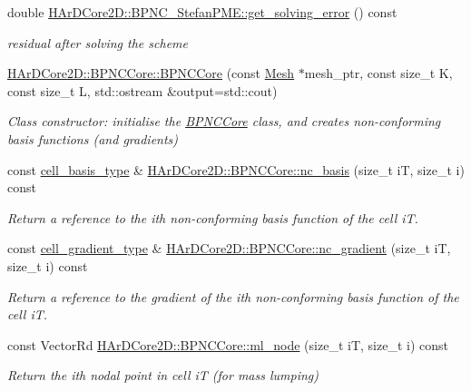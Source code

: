\begin{DoxyCompactItemize}
\mbox{\label{group__BPNC_gabb15277c1c88313e9e8e18186fea2b2f}} 
double \hyperlink{group__BPNC_gabb15277c1c88313e9e8e18186fea2b2f}{H\+Ar\+D\+Core2\+D\+::\+B\+P\+N\+C\+\_\+\+Stefan\+P\+M\+E\+::get\+\_\+solving\+\_\+error} () const
\begin{DoxyCompactList}\small\item\em residual after solving the scheme \end{DoxyCompactList}\item 
\hyperlink{group__BPNC_ga063bc1a24f9fbe136809f447fc25a486}{H\+Ar\+D\+Core2\+D\+::\+B\+P\+N\+C\+Core\+::\+B\+P\+N\+C\+Core} (const \hyperlink{classHArDCore2D_1_1Mesh}{Mesh} $\ast$mesh\+\_\+ptr, const size\+\_\+t K, const size\+\_\+t L, std\+::ostream \&output=std\+::cout)
\begin{DoxyCompactList}\small\item\em Class constructor\+: initialise the \hyperlink{classHArDCore2D_1_1BPNCCore}{B\+P\+N\+C\+Core} class, and creates non-\/conforming basis functions (and gradients) \end{DoxyCompactList}\item 
const \hyperlink{classHArDCore2D_1_1BPNCCore_a3aa8544d9ea9ae31d70e65aaefb0e9c8}{cell\+\_\+basis\+\_\+type} \& \hyperlink{group__BPNC_ga169de49549ae3c009c54c24d72d2e0ec}{H\+Ar\+D\+Core2\+D\+::\+B\+P\+N\+C\+Core\+::nc\+\_\+basis} (size\+\_\+t iT, size\+\_\+t i) const
\begin{DoxyCompactList}\small\item\em Return a reference to the i\textquotesingle{}th non-\/conforming basis function of the cell iT. \end{DoxyCompactList}\item 
const \hyperlink{classHArDCore2D_1_1BPNCCore_a3e1f027c19acfc768851fbdbb00f2eec}{cell\+\_\+gradient\+\_\+type} \& \hyperlink{group__BPNC_ga967af6ae54aa35135ab8edb9cb94f1cf}{H\+Ar\+D\+Core2\+D\+::\+B\+P\+N\+C\+Core\+::nc\+\_\+gradient} (size\+\_\+t iT, size\+\_\+t i) const
\begin{DoxyCompactList}\small\item\em Return a reference to the gradient of the i\textquotesingle{}th non-\/conforming basis function of the cell iT. \end{DoxyCompactList}\item 
const Vector\+Rd \hyperlink{group__BPNC_ga554c5835189ff791d8db8f0e31c222dd}{H\+Ar\+D\+Core2\+D\+::\+B\+P\+N\+C\+Core\+::ml\+\_\+node} (size\+\_\+t iT, size\+\_\+t i) const
\begin{DoxyCompactList}\small\item\em Return the i\textquotesingle{}th nodal point in cell iT (for mass lumping) \end{DoxyCompactList}\item 

\end{DoxyCompactItemize}
